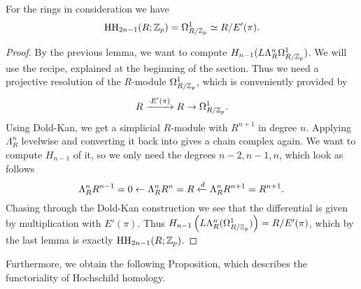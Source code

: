 \begin{lem}
    For the rings in consideration we have
    \begin{equation*}
        \operatorname{HH}_{2n-1}(R;\mathbb{Z}_p)=\Omega^1_{R/\mathbb{Z}_p}\simeq R/E'(\pi).
    \end{equation*}
\end{lem}
\begin{proof}
    By the previous lemma, we want to compute $H_{n-1}(L\Lambda^{n}_R \Omega^1_{R/\mathbb{Z}_p})$. We will use the recipe, explained at the beginning of the section. Thus we need a projective resolution of the $R$-module $\Omega^1_{R/\mathbb{Z}_p}$, which is conveniently provided by 
    \begin{equation*}
       R\xrightarrow{\cdot E'(\pi)} R\to \Omega^1_{R/\mathbb{Z}_p}. 
    \end{equation*}
    Using Dold-Kan, we get a simplicial $R$-module with $R^{n+1}$ in degree $n$. Applying $\Lambda_R^n$ levelwise and converting it back into gives a chain complex again. We want to compute $H_{n-1}$ of it, so we only need the degrees $n-2,n-1,n$, which look as follows 
    \begin{equation*}
        \Lambda_R^nR^{n-1}=0\leftarrow \Lambda_R^n R^n=R \xleftarrow{d} \Lambda_R^n R^{n+1}=R^{n+1}. 
    \end{equation*} 
    Chasing through the Dold-Kan construction we see that the differential is given by multiplication with $E'(\pi)$. Thus $H_{n-1}\left( L\Lambda_R^n(\Omega^1_{R/\mathbb{Z}_p}) \right)=R/E'(\pi)$, which by the last lemma is exactly $\operatorname{HH}_{2n-1}(R;\mathbb{Z}_p)$.
\end{proof}
Furthermore, we obtain the following Proposition, which describes the functoriality of Hochschild homology.
